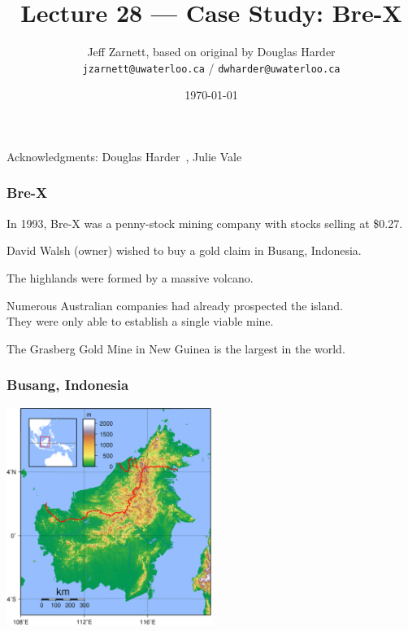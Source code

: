 

\title{Lecture 28 --- Case Study: Bre-X }

\author{Jeff Zarnett, based on original by Douglas Harder \\ \small \texttt{jzarnett@uwaterloo.ca} / \texttt{dwharder@uwaterloo.ca}}
\date{\today}




\begin{frame}
  \titlepage

\begin{center}
  \small{Acknowledgments: Douglas Harder~\cite{dwh}, Julie Vale~\cite{jv}}
  \end{center}
\end{frame}



\begin{frame}
\frametitle{Bre-X}

In 1993, Bre-X was a penny-stock mining company with stocks selling at \$0.27.

David Walsh (owner) wished to buy a gold claim in Busang, Indonesia.

The highlands were formed by a massive volcano.

Numerous Australian companies had already prospected the island.\\
\quad They were only able to establish a single viable mine.

The Grasberg Gold Mine in New Guinea is the largest in the world.

\end{frame}



\begin{frame}
\frametitle{Busang, Indonesia}

\begin{center}
	\includegraphics[width=0.5\textwidth]{images/busang.png}
\end{center}

\end{frame}



